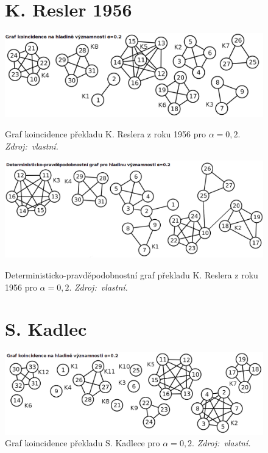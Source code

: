 \documentclass[dp.tex]{subfiles}
\begin{document}
\begin{figure}[h]
\section*{K. Resler 1956}
{
	\centering
	\includegraphics[max width=\textwidth,keepaspectratio=true]{imgs-99-priloha-d/j_k_20}
	\caption[Graf koincidence překladu K. Reslera z roku 1956 pro $\alpha = 0{,}2$]
            {Graf koincidence překladu K. Reslera z roku 1956 pro $\alpha = 0{,}2$. \textit{Zdroj:~vlastní.}}
	\label{fig:j_k_20}

	\vspace*{0.5cm}

	\includegraphics[max width=\textwidth,keepaspectratio=true]{imgs-99-priloha-d/j_d_20}
	\caption[Deterministicko-pravděpodobnostní graf překladu K. Reslera z roku 1956 pro $\alpha = 0{,}2$]
            {Deterministicko-pravděpodobnostní graf překladu K. Reslera z roku 1956 pro $\alpha = 0{,}2$. \textit{Zdroj:~vlastní.}}
	\label{fig:j_d_20}

}

\vspace*{1.5cm}

\section*{S. Kadlec}
	\centering
	\includegraphics[max width=\textwidth,keepaspectratio=true]{imgs-99-priloha-d/o_k_20}
	\caption[Graf koincidence překladu S. Kadlece pro $\alpha = 0{,}2$]
            {Graf koincidence překladu S. Kadlece pro $\alpha = 0{,}2$. \textit{Zdroj:~vlastní.}}
	\label{fig:o_k_20}
\end{figure}
\end{document}

